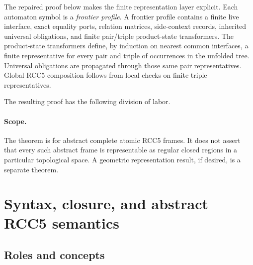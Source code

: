 \documentclass[11pt]{article}
\begin{document}
The repaired proof below makes the finite representation layer explicit.  Each automaton symbol is a \emph{frontier profile}.  A frontier profile contains a finite live interface, exact equality ports, relation matrices, side-context records, inherited universal obligations, and finite pair/triple product-state transformers.  The product-state transformers define, by induction on nearest common interfaces, a finite representative for every pair and triple of occurrences in the unfolded tree.  Universal obligations are propagated through those same pair representatives.  Global RCC5 composition follows from local checks on finite triple representatives.

The resulting proof has the following division of labor.
\begin{center}
\end{center}

\paragraph{Scope.}
The theorem is for abstract complete atomic RCC5 frames.  It does not assert that every such abstract frame is representable as regular closed regions in a particular topological space.  A geometric representation result, if desired, is a separate theorem.

\section{Syntax, closure, and abstract RCC5 semantics}

\subsection{Roles and concepts}
\end{document}
